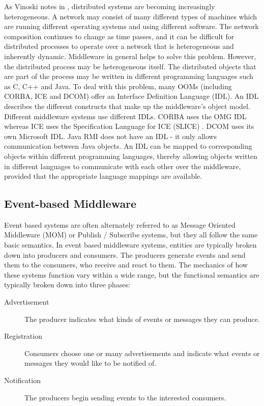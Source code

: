 \documentclass{acm_proc_article-sp}
\begin{document}
As Vinoski notes in \cite{Vinoski:2004p8371}, distributed systems are becoming increasingly heterogeneous.  A network may consist of many different types of machines which are running different operating systems and using different software.  The network composition continues to change as time passes, and it can be difficult for distributed processes to operate over a network that is heterogeneous and inherently dynamic.  Middleware in general helps to solve this problem.  However, the distributed process may be heterogeneous itself.  The distributed objects that are part of the process may be written in different programming languages such as C, C++ and Java.  To deal with this problem, many OOMs (including CORBA, ICE and DCOM) offer an Interface Definition Language (IDL).  An IDL describes the different constructs that make up the middleware's object model.  Different middleware systems use different IDLs.  CORBA uses the OMG IDL whereas ICE uses the Specification Language for ICE (SLICE) \cite{Henning:2004p8372}.  DCOM uses its own Microsoft IDL.  Java RMI does not have an IDL - it only allows communication between Java objects.  An IDL can be mapped to corresponding objects within different programming languages, thereby allowing objects written in different languages to communicate with each other over the middleware, provided that the appropriate language mappings are available.





\subsection{Event-based Middleware}
\label{sec:techeb}

Event based systems are often alternately referred to as Message Oriented Middleware (MOM) or Publish / Subscribe systems, but they all follow the same basic semantics. In event based middleware systems, entities are typically broken down into producers and consumers. The producers generate events and send them to the consumers, who receive and react to them. The mechanics of how these systems function vary within a wide range, but the functional semantics are typically broken down into three phases:

\begin{description}
\item[Advertisement] The producer indicates what kinds of events or messages they can produce.
\item[Registration] Consumers choose one or many advertisements and indicate what events or messages they would like to be notified of.
\item[Notification] The producers begin sending events to the interested consumers.
\end{description}
\end{document}
